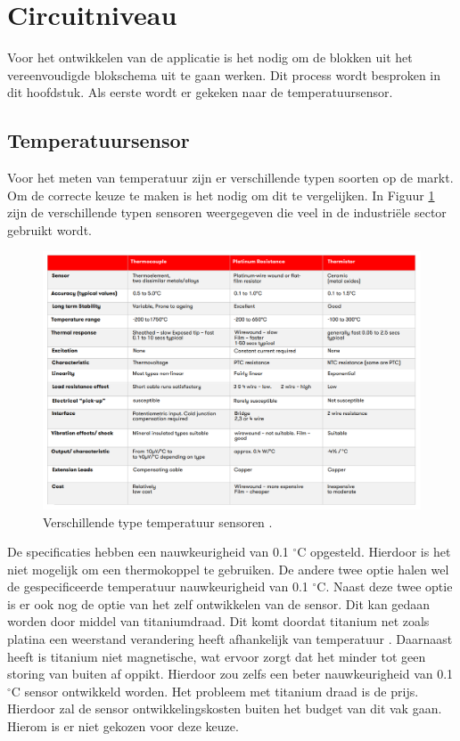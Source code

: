 \newpage
\section{Circuitniveau}
\label{Circuit_niveau}
Voor het ontwikkelen van de applicatie is het nodig om de blokken uit het vereenvoudigde blokschema uit te gaan werken. Dit process wordt besproken in dit hoofdstuk. Als eerste wordt er gekeken naar de temperatuursensor.

\subsection{Temperatuursensor}
Voor het meten van temperatuur zijn er verschillende typen soorten op de markt. Om de correcte keuze te maken is het nodig om dit te vergelijken. In Figuur \ref{fig:verschillende_temp_sensors} zijn de verschillende typen sensoren weergegeven die veel in de industriële sector gebruikt wordt.

\begin{figure}[H]
    \centering
    \includegraphics[width=1\linewidth]{pictures/RS_sensor_buyers_guide.png}
    \caption{Verschillende type temperatuur sensoren \cite{RS_temp_sensor}.}
    \label{fig:verschillende_temp_sensors}
\end{figure}

De specificaties hebben een nauwkeurigheid van 0.1 $^\circ\text{C}$ opgesteld. Hierdoor is het niet mogelijk om een thermokoppel te gebruiken. De andere twee optie halen wel de gespecificeerde temperatuur nauwkeurigheid van 0.1 $^\circ\text{C}$. Naast deze twee optie is er ook nog de optie van het zelf ontwikkelen van de sensor. Dit kan gedaan worden door middel van titaniumdraad. Dit komt doordat titanium net zoals platina een weerstand verandering heeft afhankelijk van temperatuur \cite{Titanium_temp_co}. Daarnaast heeft is titanium niet magnetische, wat ervoor zorgt dat het minder tot geen storing van buiten af oppikt. Hierdoor zou zelfs een beter nauwkeurigheid van 0.1 $^\circ\text{C}$ sensor ontwikkeld worden. Het probleem met titanium draad is de prijs. Hierdoor zal de sensor ontwikkelingskosten buiten het budget van dit vak gaan. Hierom is er niet gekozen voor deze keuze.  %

